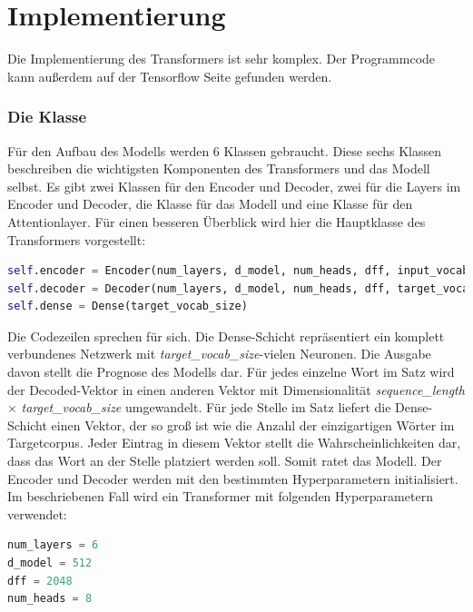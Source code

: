 \section{Implementierung}

Die Implementierung des Transformers ist sehr komplex. Der Programmcode kann außerdem auf der Tensorflow Seite \cite{transformer_tensorflow:21} gefunden werden. 

\subsubsection{Die Klasse}
Für den Aufbau des Modells werden 6 Klassen gebraucht. Diese sechs Klassen beschreiben die wichtigsten Komponenten des Transformers und das Modell selbst. Es gibt zwei Klassen für den Encoder und Decoder, zwei für die Layers im Encoder und Decoder, die Klasse für das Modell und eine Klasse für den Attentionlayer. Für einen besseren Überblick wird hier die Hauptklasse des Transformers vorgestellt:

\begin{lstlisting}[language=Python, caption={Definition des Transformers}]
self.encoder = Encoder(num_layers, d_model, num_heads, dff, input_vocab_size, pe_input, rate)
self.decoder = Decoder(num_layers, d_model, num_heads, dff, target_vocab_size, pe_target)
self.dense = Dense(target_vocab_size)
\end{lstlisting}

Die Codezeilen sprechen für sich. Die Dense-Schicht repräsentiert ein komplett verbundenes Netzwerk mit \textit{target\_vocab\_size}-vielen Neuronen. Die Ausgabe davon stellt die Prognose des Modells dar. Für jedes einzelne Wort im Satz wird der Decoded-Vektor in einen anderen Vektor mit Dimensionalität \textit{sequence\_length} $\times$ \textit{target\_vocab\_size} umgewandelt. Für jede Stelle im Satz liefert die Dense-Schicht einen Vektor, der so groß ist wie die Anzahl der einzigartigen Wörter im Targetcorpus. Jeder Eintrag in diesem Vektor stellt die Wahrscheinlichkeiten dar, dass das Wort an der Stelle platziert werden soll. Somit ratet das Modell. Der Encoder und Decoder werden mit den bestimmten Hyperparametern initialisiert. Im beschriebenen Fall wird ein Transformer mit folgenden Hyperparametern verwendet:

\begin{lstlisting}[language=Python, caption={Hyperparameter}]
num_layers = 6
d_model = 512
dff = 2048
num_heads = 8
\end{lstlisting}

